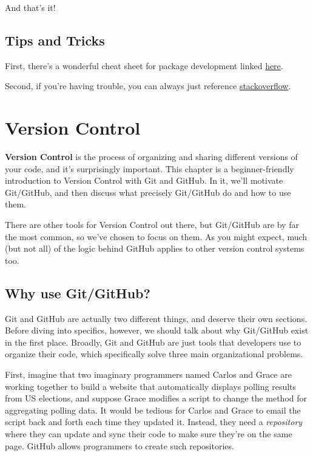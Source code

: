 \documentclass[
]{book}
\begin{document}
And that's it!

\hypertarget{tips-and-tricks-1}{%
\section{Tips and Tricks}\label{tips-and-tricks-1}}

First, there's a wonderful cheat sheet for package development linked \href{https://www.rstudio.com/wp-content/uploads/2015/06/devtools-cheatsheet.pdf}{here}.

Second, if you're having trouble, you can always just reference \href{https://stackoverflow.com/questions/tagged/r}{stackoverflow}.

\hypertarget{version-control}{%
\chapter{Version Control}\label{version-control}}

\textbf{Version Control} is the process of organizing and sharing different versions of your code, and it's surprisingly important. This chapter is a beginner-friendly introduction to Version Control with Git and GitHub. In it, we'll motivate Git/GitHub, and then discuss what precisely Git/GitHub do and how to use them.

There are other tools for Version Control out there, but Git/GitHub are by far the most common, so we've chosen to focus on them. As you might expect, much (but not all) of the logic behind GitHub applies to other version control systems too.

\hypertarget{why-use-gitgithub}{%
\section{Why use Git/GitHub?}\label{why-use-gitgithub}}

Git and GitHub are actually two different things, and deserve their own sections. Before diving into specifics, however, we should talk about why Git/GitHub exist in the first place. Broadly, Git and GitHub are just tools that developers use to organize their code, which specifically solve three main organizational problems.

First, imagine that two imaginary programmers named Carlos and Grace are working together to build a website that automatically displays polling results from US elections, and suppose Grace modifies a script to change the method for aggregating polling data. It would be tedious for Carlos and Grace to email the script back and forth each time they updated it. Instead, they need a \emph{repository} where they can update and sync their code to make sure they're on the same page. GitHub allows programmers to create such repositories.
\end{document}
